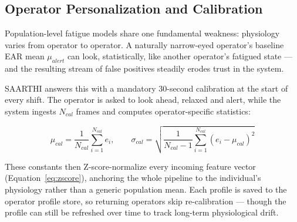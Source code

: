 \subsection{Operator Personalization and Calibration}

Population-level fatigue models share one fundamental weakness: physiology varies
from operator to operator. A naturally narrow-eyed operator's baseline EAR mean
$\mu_{alert}$ can look, statistically, like another operator's fatigued state ---
and the resulting stream of false positives steadily erodes trust in the system.

SAARTHI answers this with a mandatory 30-second calibration at the start of every
shift. The operator is asked to look ahead, relaxed and alert, while the system
ingests $N_{cal}$ frames and computes operator-specific statistics:

\begin{equation}
\mu_{cal} = \frac{1}{N_{cal}} \sum_{i=1}^{N_{cal}} e_i,
\qquad
\sigma_{cal} = \sqrt{\frac{1}{N_{cal}-1} \sum_{i=1}^{N_{cal}} (e_i - \mu_{cal})^2}
\end{equation}

These constants then Z-score-normalize every incoming feature vector
(Equation~\ref{eq:zscore}), anchoring the whole pipeline to the individual's
physiology rather than a generic population mean. Each profile is saved to the
operator profile store, so returning operators skip re-calibration --- though the
profile can still be refreshed over time to track long-term physiological drift.


